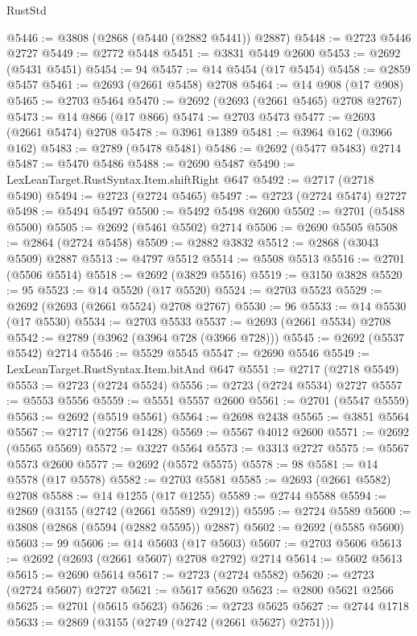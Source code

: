 \begin{lexlean}{RustStd}
\begin{coremodule}
@5446 := @3808 (@2868 (@5440 (@2882 @5441)) @2887)
@5448 := @2723 @5446 @2727
@5449 := @2772 @5448
@5451 := @3831 @5449 @2600
@5453 := @2692 (@5431 @5451)
@5454 := 94
@5457 := @14 @5454 (@17 @5454)
@5458 := @2859 @5457
@5461 := @2693 (@2661 @5458) @2708
@5464 := @14 @908 (@17 @908)
@5465 := @2703 @5464
@5470 := @2692 (@2693 (@2661 @5465) @2708 @2767)
@5473 := @14 @866 (@17 @866)
@5474 := @2703 @5473
@5477 := @2693 (@2661 @5474) @2708
@5478 := @3961 @1389
@5481 := @3964 @162 (@3966 @162)
@5483 := @2789 (@5478 @5481)
@5486 := @2692 (@5477 @5483) @2714
@5487 := @5470 @5486
@5488 := @2690 @5487
@5490 := LexLeanTarget.RustSyntax.Item.shiftRight @647
@5492 := @2717 (@2718 @5490)
@5494 := @2723 (@2724 @5465)
@5497 := @2723 (@2724 @5474) @2727
@5498 := @5494 @5497
@5500 := @5492 @5498 @2600
@5502 := @2701 (@5488 @5500)
@5505 := @2692 (@5461 @5502) @2714
@5506 := @2690 @5505
@5508 := @2864 (@2724 @5458)
@5509 := @2882 @3832
@5512 := @2868 (@3043 @5509) @2887
@5513 := @4797 @5512
@5514 := @5508 @5513
@5516 := @2701 (@5506 @5514)
@5518 := @2692 (@3829 @5516)
@5519 := @3150 @3828
@5520 := 95
@5523 := @14 @5520 (@17 @5520)
@5524 := @2703 @5523
@5529 := @2692 (@2693 (@2661 @5524) @2708 @2767)
@5530 := 96
@5533 := @14 @5530 (@17 @5530)
@5534 := @2703 @5533
@5537 := @2693 (@2661 @5534) @2708
@5542 := @2789 (@3962 (@3964 @728 (@3966 @728)))
@5545 := @2692 (@5537 @5542) @2714
@5546 := @5529 @5545
@5547 := @2690 @5546
@5549 := LexLeanTarget.RustSyntax.Item.bitAnd @647
@5551 := @2717 (@2718 @5549)
@5553 := @2723 (@2724 @5524)
@5556 := @2723 (@2724 @5534) @2727
@5557 := @5553 @5556
@5559 := @5551 @5557 @2600
@5561 := @2701 (@5547 @5559)
@5563 := @2692 (@5519 @5561)
@5564 := @2698 @2438
@5565 := @3851 @5564
@5567 := @2717 (@2756 @1428)
@5569 := @5567 @4012 @2600
@5571 := @2692 (@5565 @5569)
@5572 := @3227 @5564
@5573 := @3313 @2727
@5575 := @5567 @5573 @2600
@5577 := @2692 (@5572 @5575)
@5578 := 98
@5581 := @14 @5578 (@17 @5578)
@5582 := @2703 @5581
@5585 := @2693 (@2661 @5582) @2708
@5588 := @14 @1255 (@17 @1255)
@5589 := @2744 @5588
@5594 := @2869 (@3155 (@2742 (@2661 @5589) @2912))
@5595 := @2724 @5589
@5600 := @3808 (@2868 (@5594 (@2882 @5595)) @2887)
@5602 := @2692 (@5585 @5600)
@5603 := 99
@5606 := @14 @5603 (@17 @5603)
@5607 := @2703 @5606
@5613 := @2692 (@2693 (@2661 @5607) @2708 @2792) @2714
@5614 := @5602 @5613
@5615 := @2690 @5614
@5617 := @2723 (@2724 @5582)
@5620 := @2723 (@2724 @5607) @2727
@5621 := @5617 @5620
@5623 := @2800 @5621 @2566
@5625 := @2701 (@5615 @5623)
@5626 := @2723 @5625
@5627 := @2744 @1718
@5633 := @2869 (@3155 (@2749 (@2742 (@2661 @5627) @2751)))

\end{coremodule}
\end{lexlean}
